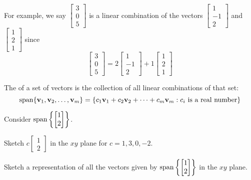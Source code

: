 \begin{applicationActivities}{2}{8}
\begin{definition}
  For example, we say $\begin{bmatrix}3 \\0 \\ 5\end{bmatrix}$ is a linear combination of the vectors $\begin{bmatrix} 1 \\ -1 \\ 2 \end{bmatrix}$ and $\begin{bmatrix} 1 \\ 2 \\ 1 \end{bmatrix}$ since $$\begin{bmatrix} 3 \\ 0 \\ 5 \end{bmatrix} = 2 \begin{bmatrix} 1 \\ -1 \\ 2 \end{bmatrix} + 1\begin{bmatrix} 1 \\ 2 \\ 1 \end{bmatrix}$$
\end{definition}

\begin{definition}
  The  of a set of vectors is the collection of all linear
  combinations of that set:
  \[
    \operatorname{span}\{\mathbf v_1,\mathbf v_2,\dots,\mathbf v_m\} =
    \{c_1\mathbf v_1+c_2\mathbf v_2+\dots+c_m\mathbf v_m :
    c_i\text{ is a real number}\}
  \]
\end{definition}

\begin{activity}{10}
  Consider \(\operatorname{span}\left\{\begin{bmatrix}1\\2\end{bmatrix}\right\}\).
  \begin{subactivity}
    Sketch
    \(c\begin{bmatrix}1\\2\end{bmatrix}\) in the \(xy\) plane
    for \(c=1,3,0,-2\).
  \end{subactivity}
  \begin{subactivity}
    Sketch a representation of all the vectors given by
    \(\operatorname{span}\left\{\begin{bmatrix}1\\2\end{bmatrix}\right\}\)
    in the \(xy\) plane.
  \end{subactivity}
\end{activity}


\end{applicationActivities}
